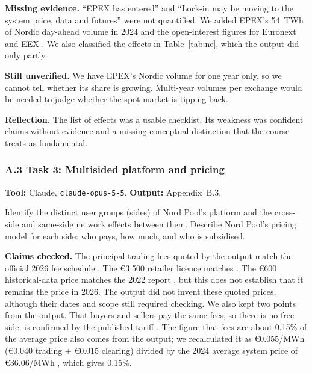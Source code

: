 \textbf{Missing evidence.}
``EPEX has entered'' and ``Lock-in may be moving to the system
price, data and futures''
were not quantified. We added EPEX's 54~TWh of Nordic
day-ahead volume in 2024 \citep{EPEX2025}
and the open-interest figures for Euronext and EEX
\citep{Euronext2026,EEX2026}.
We also classified the effects in Table~\ref{tab:ne},
which the output did only partly.

\textbf{Still unverified.} We have EPEX's Nordic volume for
one year only, so we cannot tell whether its share is
growing. Multi-year volumes per exchange would be needed to
judge whether the spot market is tipping back.

\textbf{Reflection.} The list of effects was a usable
checklist. Its weakness was confident claims without
evidence and a missing conceptual distinction that
the course treats as fundamental.

\subsubsection*{A.3 Task 3: Multisided platform and pricing}

\textbf{Tool:} Claude, \texttt{claude-opus-5-5}.
\quad \textbf{Output:} Appendix~B.3.

\begin{promptbox}
Identify the distinct user groups (sides) of Nord Pool's
platform and the cross-side and same-side network effects
between them. Describe Nord Pool's pricing model for
each side: who pays, how much, and who is subsidised.
\end{promptbox}

\textbf{Claims checked.}
The principal trading fees quoted by the output match
the official 2026 fee schedule \citep{NPFees2026}.
The €3,500 retailer licence matches \citet{NPData}.
The €600 historical-data price matches the 2022 report
\citep{ERR2022}, but this does not establish that
it remains the price in 2026.
The output did not invent these quoted prices,
although their dates and scope still required checking.
We also kept two points from the output. That buyers and
sellers pay the same fees, so there is no free side,
is confirmed by the published tariff \citep{NPFees2026}.
The figure that fees are about 0.15\% of the average price
also comes from the output; we recalculated it as
€0.055/MWh (€0.040 trading + €0.015 clearing) divided by
the 2024 average system price of €36.06/MWh \citep{NP2024},
which gives 0.15\%.


